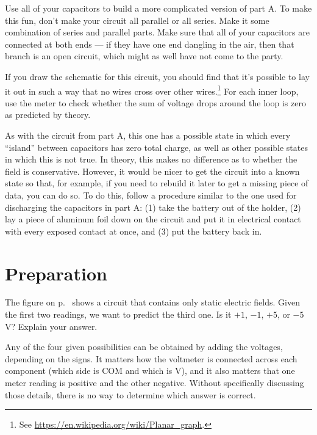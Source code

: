 
Use all of your capacitors to build a more complicated version of part A.
To make this fun, don't make your circuit all parallel or all series. Make it some
combination of series and parallel parts. Make sure that all of your capacitors are
connected at both ends --- if they have one end dangling in the air, then that branch
is an open circuit, which might as well have not come to the party.

If you draw the schematic for this circuit, you should find that it's possible to lay it
out in such a way that no wires cross over other wires.\footnote{See \url{https://en.wikipedia.org/wiki/Planar_graph}.}
For each inner loop, use the meter to check whether the sum of voltage
drops around the loop is zero as predicted by theory.

As with the circuit from part A, this one has a possible state in which every ``island'' between capacitors
has zero total charge, as well as other possible states in which this is not true. In theory, this makes
no difference as to whether the field is conservative. However, it would be nicer to get the circuit into
a known state so that, for example, if you need to rebuild it later to get a missing piece of data, you can
do so. To do this, follow a procedure similar to the one used for discharging the capacitors in part A:
(1) take the battery out of the holder, (2) lay a piece of aluminum foil down on the circuit and put it
in electrical contact with every exposed contact at once, and (3) put the battery back in.

\section*{Preparation}

The figure on p.~\pageref{fig:terrier-conservative} shows a circuit
that contains only static electric fields.
Given the first two readings, we want to predict the third one.
Is it $+1$, $-1$, $+5$, or $-5$ V? Explain your answer.

Any of the four given possibilities can be obtained by adding the
voltages, depending on the signs. It matters how the voltmeter is
connected across each component (which side is COM and which is V),
and it also matters that one meter reading is positive and the other
negative. Without specifically discussing those details, there is no
way to determine which answer is correct.

